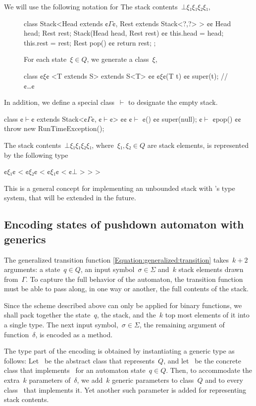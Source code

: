 We will use the following notation for
The stack contents~$⊥ξ₁ξ₁ξ₂ξ₁$,

\begin{figure}[H]
\begin{JAVA}
class Stack<Head extends ¢$Γ$¢, Rest extends Stack<?,?> > {¢¢
  Head head;
  Rest rest;
  Stack(Head head, Rest rest) {¢¢ this.head = head; this.rest = rest;}
  Rest pop() {¢¢ return rest; };
}
\end{JAVA}
For each state~$ξ∈Q$, we generate a \Java class~$ξ$,
\begin{JAVA}
class ¢$ξ$¢ <T extends S> extends S<T> {¢¢
  ¢$ξ$¢(T t) {¢¢ super(t); }
  // ¢…¢
}
\end{JAVA}
\end{figure}
In addition, we define a special class~$\vdash$ to designate the empty stack.
\begin{JAVA}
class ¢$\vdash$¢ extends Stack<¢$Γ$¢, ¢$\vdash$¢> {¢¢
  ¢$\vdash$ ¢() {¢¢ super(null); }
  ¢$\vdash$ ¢pop() {¢¢ throw new RunTimeException(); }
}
\end{JAVA}
The stack contents~$⊥ξ₁ξ₁ξ₂ξ₁$,
where~$ξ₁,ξ₂∈Q$ are stack elements,
is represented by the following type
\begin{JAVA}
  ¢$ξ₁$¢ < ¢$ξ₂$¢ < ¢$ξ₁$¢ < ¢$⊥$ > > >
\end{JAVA}
This is a general concept for implementing an unbounded stack with \Java's type system,
that will be extended in the future.

\subsection{Encoding states of pushdown automaton with \Java generics}
The generalized transition function \cref{Equation:generalized:transition}
  takes~$k+2$ arguments: a state~$q∈Q$, an input symbol~$σ∈Σ$
    and~$k$ stack elements drawn from~$Γ$.
To capture the full behavior of the automaton, the transition function
  must be able to pass along, in one way or another, the full contents of the stack.

Since the scheme described above can only be applied for binary functions,
  we shall pack together the state~$q$, the stack, and the~$k$ top most
  elements of it into a single type.
The next input symbol,~$σ∈Σ$, the remaining argument of function~$δ$,
  is encoded as a method.

The type part of the encoding is obtained by instantiating a generic type as follows:
Let~ be the abstract class that represents~$Q$, and let~ be the concrete class that
  implements~ for an automaton state~$q∈Q$.
Then, to accommodate the extra~$k$ parameters of~$δ$, we add~$k$ generic parameters
  to class~$Q$ and to every class~ that implements it.
Yet another such parameter is added for representing stack contents.

